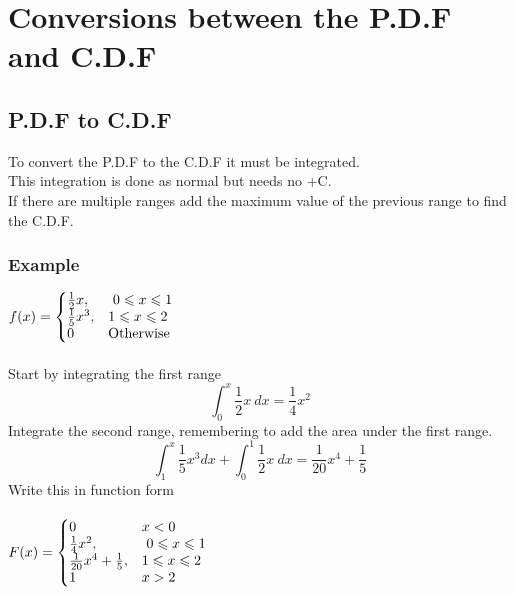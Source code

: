\documentclass{article}[18pt]
\begin{document}
\section{Conversions between the P.D.F and C.D.F}
\subsection{P.D.F to C.D.F}
To convert the P.D.F to the C.D.F it must be integrated.\\
This integration is done as normal but needs no +C.\\
If there are multiple ranges add the maximum value of the previous range to find the C.D.F.
\subsubsection{Example}
{\renewcommand{\arraystretch}{1.5}
$
  f(x)=\left\{
  \begin{array}{@{}ll@{}}
    \frac{1}{2}x, & \ 0\leqslant x\leqslant1\\
    \frac{1}{5}x^3, &  1\leqslant x \leqslant 2\\
    0 & \textrm{Otherwise}
  \end{array}\right.
$}\\
\\
Start by integrating the first range
$$\int_0^x \frac{1}{2}x \ dx=\frac{1}{4}x^2$$
Integrate the second range, remembering to add the area under the first range.
$$\int_1^x \frac{1}{5}x^3 dx+\int_0^1\frac{1}{2}x \ dx=\frac{1}{20}x^4+\frac{1}{5}$$
Write this in function form\\
\\
{\renewcommand{\arraystretch}{1.5}
$
  F(x)=\left\{
  \begin{array}{@{}ll@{}}
  0 & x<0\\
    \frac{1}{4}x^2, & \ 0\leqslant x\leqslant1\\
    \frac{1}{20}x^4+\frac{1}{5}, &  1\leqslant x \leqslant 2\\
    1 & x>2
  \end{array}\right.
$}\\
\end{document}
